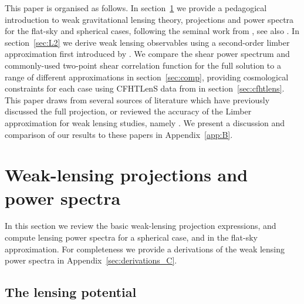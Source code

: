 \documentclass[fleqn,usenatbib]{mnras} %
\begin{document}
This paper is organised as follows.  In section~\ref{sec:wl} we provide a
pedagogical introduction to weak gravitational lensing theory, projections and
power spectra for the flat-sky and spherical cases, following the seminal work
from \citet{2000PhRvD..62d3007H}, see also \citet{2005PhRvD..72b3516C}. In section~\ref{sec:L2} we
derive weak lensing observables using a second-order limber approximation first
introduced by \citet{2008PhRvD..78l3506L}. We compare the shear power spectrum
and commonly-used two-point shear correlation function for the full solution to
a range of different approximations in section~\ref{sec:comp}, providing
cosmological constraints for each case using CFHTLenS data from
\citet{CFHTLenS-2pt-notomo} in section~\ref{sec:cfhtlens}. This paper draws
from several sources of literature which have previously discussed the full
projection, or reviewed the accuracy of the Limber approximation for weak
lensing studies, namely \citet{2008PhRvD..78d3002S,2012PhRvD..86b3001B,
2012MNRAS.422.2854G, 2016arXiv161104954K}. We present a discussion and
comparison of our results to these papers in Appendix~\ref{app:B}.


\section{Weak-lensing projections and power spectra}
\label{sec:wl}

In this section we review the basic weak-lensing projection expressions, and
compute lensing power spectra for a spherical case, and in the flat-sky
approximation. For completeness we provide a derivations of the weak lensing power spectra in Appendix~\ref{sec:derivations_C}.

\subsection{The lensing potential}
\label{sec:psi}
\end{document}
